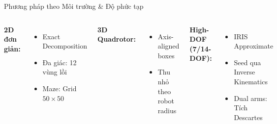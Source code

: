 \documentclass[aspectratio=169]{beamer}
\begin{document}
\begin{frame}{Phương pháp theo Môi trường \& Độ phức tạp}

    \begin{columns}[c]

        \textbf{2D đơn giản:}
        \begin{itemize}
            \item Exact Decomposition
            \item Đa giác: 12 vùng lồi
            \item Maze: Grid $50 \times 50$
        \end{itemize}
    
        \vspace{0.8em}
        \textbf{3D Quadrotor:}
        \begin{itemize}
            \item Axis-aligned boxes
            \item Thu nhỏ theo robot radius
        \end{itemize}
    
        \vspace{0.8em}
        \textbf{High-DOF (7/14-DOF):}
        \begin{itemize}
            \item IRIS Approximate
            \item Seed qua Inverse Kinematics
            \item Dual arms: Tích Descartes
        \end{itemize}

        \includegraphics[width=\textwidth]{../imgs/2d-decompose-ex.png}
        
    \end{columns}

\end{frame}
\end{document}
